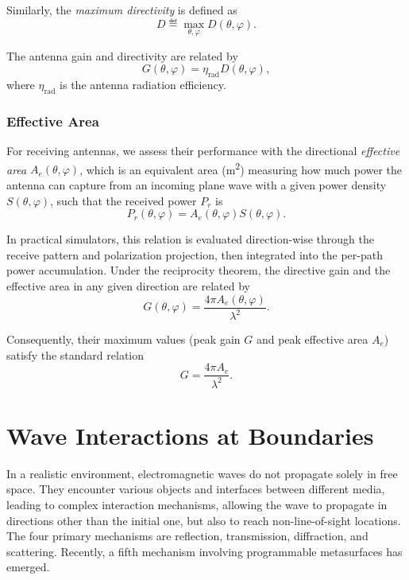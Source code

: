 Similarly, the \emph{maximum directivity} is defined as
\begin{equation}
  D \eqdef \max_{\theta, \varphi} D(\theta, \varphi).
\end{equation}

The antenna gain and directivity are related by
\begin{equation}
  G(\theta, \varphi) = \eta_{\text{rad}} D(\theta, \varphi),
\end{equation}
where $\eta_{\text{rad}}$ is the antenna radiation efficiency.

\subsubsection{Effective Area}

For receiving antennas, we assess their performance with the directional \emph{effective area} $A_e(\theta, \varphi)$, which is an equivalent area (\unit{\meter\squared}) measuring how much power the antenna can capture from an incoming plane wave with a given power density $S(\theta, \varphi)$, such that the received power $P_r$ is
\begin{equation}
  P_r(\theta, \varphi) = A_e(\theta, \varphi) S(\theta, \varphi).
\end{equation}

In practical simulators, this relation is evaluated direction-wise through the receive pattern and polarization projection, then integrated into the per-path power accumulation. Under the reciprocity theorem, the directive gain and the effective area in any given direction are related by
\begin{equation}
  G(\theta, \varphi) = \frac{4\pi A_e(\theta, \varphi)}{\lambda^2}.
\end{equation}

Consequently, their maximum values (peak gain $G$ and peak effective area $A_e$) satisfy the standard relation
\begin{equation}
  G = \frac{4\pi A_e}{\lambda^2}.
\end{equation}

\section{Wave Interactions at Boundaries}

In a realistic environment, electromagnetic waves do not propagate solely in \gls{free space}. They encounter various objects and interfaces between different media, leading to complex interaction mechanisms, allowing the wave to propagate in directions other than the initial one, but also to reach non-\gls{line-of-sight} locations. The four primary mechanisms are reflection, transmission, diffraction, and scattering. Recently, a fifth mechanism involving programmable metasurfaces has emerged.

